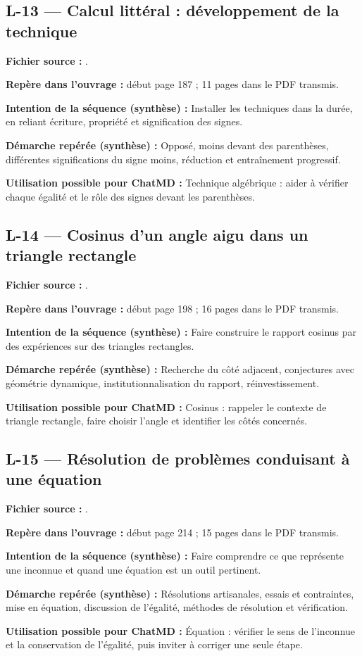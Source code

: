 \documentclass[11pt,a4paper]{article}
\begin{document}
\subsection{L-13 — Calcul littéral : développement de la technique}
\textbf{Fichier source :} .\par
\textbf{Repère dans l’ouvrage :} début page 187 ; 11 pages dans le PDF transmis.\par
\textbf{Intention de la séquence (synthèse) :} Installer les techniques dans la durée, en reliant écriture, propriété et signification des signes.\par
\textbf{Démarche repérée (synthèse) :} Opposé, moins devant des parenthèses, différentes significations du signe moins, réduction et entraînement progressif.\par
\textbf{Utilisation possible pour ChatMD :} Technique algébrique : aider à vérifier chaque égalité et le rôle des signes devant les parenthèses.\par
\subsection{L-14 — Cosinus d’un angle aigu dans un triangle rectangle}
\textbf{Fichier source :} .\par
\textbf{Repère dans l’ouvrage :} début page 198 ; 16 pages dans le PDF transmis.\par
\textbf{Intention de la séquence (synthèse) :} Faire construire le rapport cosinus par des expériences sur des triangles rectangles.\par
\textbf{Démarche repérée (synthèse) :} Recherche du côté adjacent, conjectures avec géométrie dynamique, institutionnalisation du rapport, réinvestissement.\par
\textbf{Utilisation possible pour ChatMD :} Cosinus : rappeler le contexte de triangle rectangle, faire choisir l’angle et identifier les côtés concernés.\par
\subsection{L-15 — Résolution de problèmes conduisant à une équation}
\textbf{Fichier source :} .\par
\textbf{Repère dans l’ouvrage :} début page 214 ; 15 pages dans le PDF transmis.\par
\textbf{Intention de la séquence (synthèse) :} Faire comprendre ce que représente une inconnue et quand une équation est un outil pertinent.\par
\textbf{Démarche repérée (synthèse) :} Résolutions artisanales, essais et contraintes, mise en équation, discussion de l’égalité, méthodes de résolution et vérification.\par
\textbf{Utilisation possible pour ChatMD :} Équation : vérifier le sens de l’inconnue et la conservation de l’égalité, puis inviter à corriger une seule étape.\par
\end{document}
